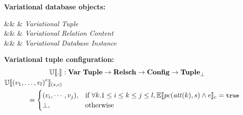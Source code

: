 \begin{figure}
%
\textbf{Variational database objects:}
\begin{syntax}
%
\synDef \vTuple {\vartype \tupletype} &\eqq&  & \textit{Variational Tuple}\\
\synDef \vRelCont \vRelContSet &\eqq& \setDef {\vi \vTuple \numTuples} & \textit{Variational Relation Content}\\
\synDef \vdbInst \vdbInstSet &\eqq& \annot [\dimMeta] {\setDef {\vi \vTab \numRels} } & \textit{Variational Database Instance}
\end{syntax}

\medskip
\textbf{Variational tuple configuration:}
%
\begin{alignat*}{1}%
\ouSemType [] . &: {\vartype \tupletype} \to \vRelSchSet \to \confSet \to \maybe \tupletype\\
%
\ouSem{\vRelSch} {\annot  {\left( {\vi v \numAtts}\right)}}  &\\
& \hspace{-50pt} = \begin{cases}
(v_i, \cdots, v_j), &\If \forall k. 1 \leq i \leq k \leq j \leq l, \fSem {\getPCfrom {\getAtt {k}} \vRelSch \wedge \dimMeta} = \t\\
\bot, &\Otherwise
\end{cases}
\end{alignat*}


\end{figure}
